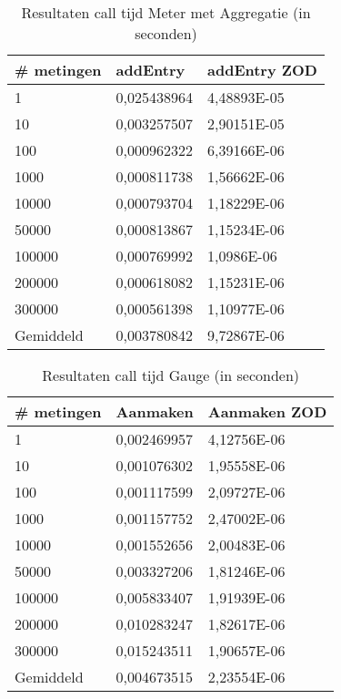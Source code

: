\begin{table}[]
\centering
\begin{tabular}{|l|l|l|}
\hline
\# metingen & addEntry    & addEntry ZOD \\ \hline
1           & 0,025438964 & 4,48893E-05  \\ \hline
10          & 0,003257507 & 2,90151E-05  \\ \hline
100         & 0,000962322 & 6,39166E-06  \\ \hline
1000        & 0,000811738 & 1,56662E-06  \\ \hline
10000       & 0,000793704 & 1,18229E-06  \\ \hline
50000       & 0,000813867 & 1,15234E-06  \\ \hline
100000      & 0,000769992 & 1,0986E-06   \\ \hline
200000      & 0,000618082 & 1,15231E-06  \\ \hline
300000      & 0,000561398 & 1,10977E-06  \\ \hline
Gemiddeld   & 0,003780842 & 9,72867E-06  \\ \hline
\end{tabular}
\caption{Resultaten call tijd Meter met Aggregatie (in seconden)}
\label{Table:MeterAggregate}
\end{table}


\begin{table}[]
\centering
\begin{tabular}{|l|l|l|}
\hline
\# metingen & Aanmaken    & Aanmaken ZOD \\ \hline
1           & 0,002469957 & 4,12756E-06  \\ \hline
10          & 0,001076302 & 1,95558E-06  \\ \hline
100         & 0,001117599 & 2,09727E-06  \\ \hline
1000        & 0,001157752 & 2,47002E-06  \\ \hline
10000       & 0,001552656 & 2,00483E-06  \\ \hline
50000       & 0,003327206 & 1,81246E-06  \\ \hline
100000      & 0,005833407 & 1,91939E-06  \\ \hline
200000      & 0,010283247 & 1,82617E-06  \\ \hline
300000      & 0,015243511 & 1,90657E-06  \\ \hline
Gemiddeld   & 0,004673515 & 2,23554E-06  \\ \hline
\end{tabular}
\caption{Resultaten call tijd Gauge (in seconden)}
\label{Table:Gauge}
\end{table}


